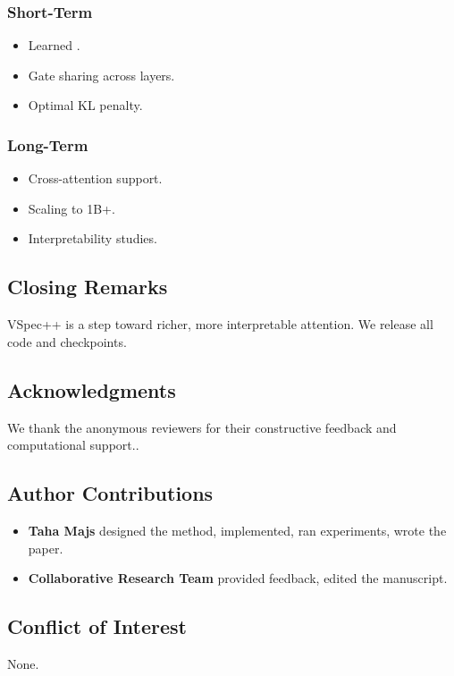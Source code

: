 \subsubsection{Short-Term}
\begin{itemize}
\item Learned  .
\item Gate sharing across layers.
\item Optimal KL penalty.

\end{itemize}
\subsubsection{Long-Term}
\begin{itemize}
\item Cross-attention support.
\item Scaling to 1B+.
\item Interpretability studies.

\end{itemize}
\subsection{Closing Remarks}

VSpec++ is a step toward richer, more interpretable attention. We release 
all code and checkpoints.

\subsection{Acknowledgments}

We thank the anonymous reviewers for their constructive feedback and computational support..

\subsection{Author Contributions}

\begin{itemize}
\item \textbf{Taha Majs} designed the method, implemented, ran experiments, wrote
  the paper.
\item \textbf{Collaborative Research Team} provided feedback, edited the manuscript.

\end{itemize}
\subsection{Conflict of Interest}

None.


